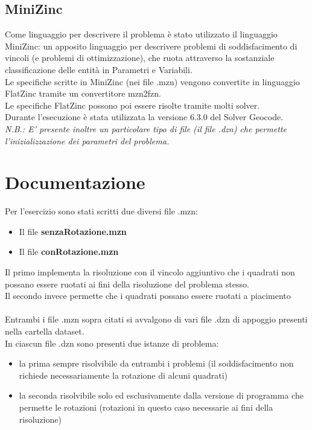 \documentclass{article}
\begin{document}
\subsection{MiniZinc}
Come linguaggio per descrivere il problema è stato utilizzato il linguaggio MiniZinc: un apposito linguaggio per descrivere problemi di soddisfacimento di vincoli (e problemi di
ottimizzazione), che ruota attraverso la sostanziale classificazione delle entità in Parametri e Variabili.\\
Le specifiche scritte in MiniZinc (nei file .mzn) vengono convertite in linguaggio FlatZinc tramite un convertitore mzn2fzn.\\
Le specifiche FlatZinc possono poi essere risolte tramite
molti solver.\\
Durante l'esecuzione è stata utilizzata la versione 6.3.0 del Solver Geocode.
\\
\textit{N.B.: E' presente inoltre un particolare tipo di file (il file .dzn) che permette l'inizializzazione dei parametri del problema.} 

\newpage

\section{Documentazione}
Per l'esercizio sono stati scritti due diversi file .mzn:
\begin{itemize}

\item Il file \textbf{senzaRotazione.mzn} 

\item Il file \textbf{conRotazione.mzn}

\end{itemize}

\begin{flushleft}
Il primo implementa la risoluzione con il vincolo aggiuntivo che i quadrati non possano essere ruotati ai fini della risoluzione del problema stesso.\\

Il secondo invece permette che i quadrati possano essere ruotati a piacimento\\\\

Entrambi i  file .mzn sopra citati si avvalgono di vari file .dzn di appoggio presenti nella cartella dataset.\\
In ciascun file .dzn sono presenti due istanze di problema:
\begin{itemize}

\item la prima sempre risolvibile da entrambi i problemi (il soddisfacimento non richiede necessariamente la rotazione di alcuni quadrati)

\item la seconda risolvibile solo ed esclusivamente dalla versione di programma che permette le rotazioni (rotazioni in questo caso necessarie ai fini della risoluzione)
\end{itemize}
\end{flushleft}
\end{document}

